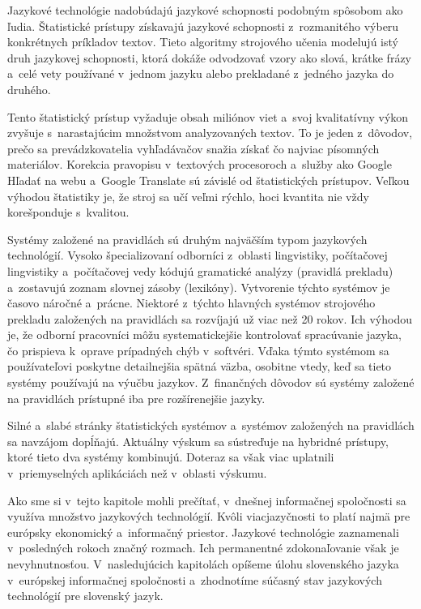\begin{multicols}{2}

Jazykové technológie nadobúdajú jazykové schopnosti podobným spôsobom ako ľudia. Štatistické prístupy získavajú jazykové schopnosti z~rozmanitého výberu konkrétnych príkladov textov. Tieto algoritmy strojového učenia modelujú istý druh jazykovej schopnosti, ktorá dokáže odvodzovať vzory ako slová, krátke frázy a~celé vety používané v~jednom jazyku alebo prekladané z~jedného jazyka do druhého.  

Tento štatistický prístup vyžaduje obsah miliónov viet a~svoj kvalitatívny výkon zvyšuje s~narastajúcim množstvom analyzovaných textov. To je jeden z~dôvodov, prečo sa prevádzkovatelia vyhľadávačov snažia získať čo najviac písomných materiálov. Korekcia pravopisu v~textových procesoroch a~služby ako Google Hľadať na webu\cite{f2} a~Google Translate sú závislé od štatistických prístupov. Veľkou výhodou štatistiky je, že stroj sa učí veľmi rýchlo, hoci kvantita nie vždy korešponduje s~kvalitou.

Systémy založené na pravidlách sú druhým najväčším typom jazykových technológií. Vysoko špecializovaní odborníci z~oblasti lingvistiky, počítačovej lingvistiky a~počítačovej vedy kódujú gramatické analýzy (pravidlá prekladu) a~zostavujú zoznam slovnej zásoby (lexikóny). Vytvorenie týchto systémov je časovo náročné a~prácne. Niektoré z~týchto hlavných systémov strojového prekladu založených na pravidlách sa  rozvíjajú už viac než 20 rokov. Ich výhodou je, že odborní pracovníci môžu systematickejšie kontrolovať spracúvanie jazyka, čo prispieva k~oprave prípadných chýb v~softvéri. Vďaka týmto systémom sa používateľovi poskytne detailnejšia spätná väzba, osobitne vtedy, keď sa tieto systémy používajú na výučbu jazykov. Z~finančných dôvodov sú systémy založené na pravidlách prístupné iba pre rozšírenejšie jazyky.

Silné a~slabé stránky štatistických systémov a~systémov založených na pravidlách sa navzájom dopĺňajú. Aktuálny výskum sa sústreďuje na hybridné prístupy, ktoré tieto dva systémy kombinujú. Doteraz sa však viac uplatnili v~priemyselných aplikáciách než v~oblasti výskumu.

Ako sme si v~tejto kapitole mohli prečítať, v~dnešnej informačnej spoločnosti sa využíva množstvo jazykových technológií. Kvôli viacjazyčnosti to platí najmä pre európsky ekonomický a~informačný priestor. Jazykové technológie zaznamenali v~posledných rokoch značný rozmach. Ich permanentné zdokonaľovanie však je nevyhnutnosťou. V~nasledujúcich kapitolách opíšeme úlohu slovenského jazyka v~európskej informačnej spoločnosti a~zhodnotíme súčasný stav jazykových technológií pre slovenský jazyk.

\end{multicols}

